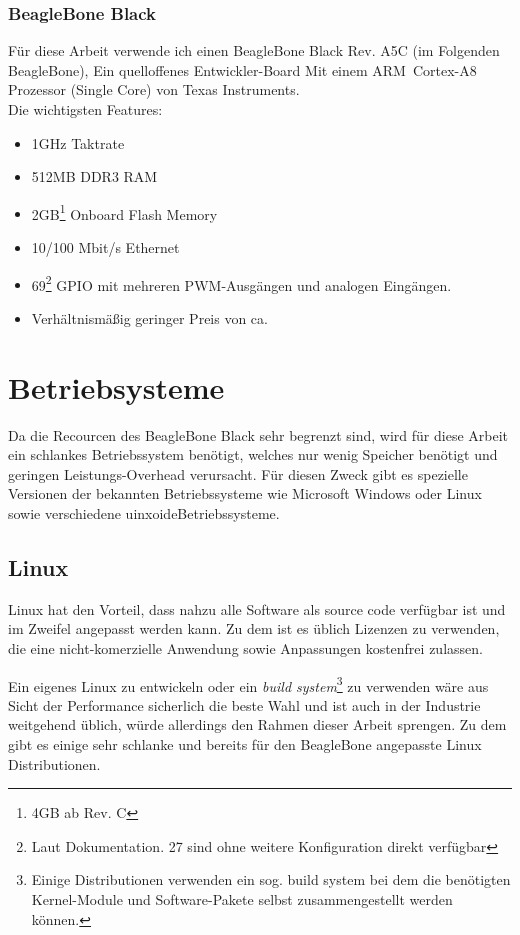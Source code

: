 \documentclass[12pt, twoside, a4paper]{scrbook}
\begin{document}
\subsection{BeagleBone Black}
Für diese Arbeit verwende ich einen BeagleBone Black Rev. A5C (im Folgenden BeagleBone), Ein quelloffenes Entwickler-Board Mit einem ARM\textregistered ~Cortex\texttrademark -A8 Prozessor (Single Core) von Texas Instruments.\\

Die wichtigsten Features:
\begin{itemize}
  \item 1GHz Taktrate
  \item 512MB DDR3 RAM
  \item 2GB\footnote{4GB ab Rev. C} Onboard Flash Memory
  \item 10/100 Mbit/s Ethernet
  \item 69\footnote{Laut Dokumentation. 27 sind ohne weitere Konfiguration direkt verfügbar} GPIO mit mehreren PWM-Ausgängen und analogen Eingängen.
  \item Verhältnismäßig geringer Preis von ca. 
\end{itemize}


\chapter{Betriebsysteme}
Da die Recourcen des BeagleBone Black sehr begrenzt sind, wird für diese Arbeit ein schlankes Betriebssystem benötigt, welches nur wenig Speicher benötigt und geringen Leistungs-Overhead verursacht. Für diesen Zweck gibt es spezielle Versionen der bekannten Betriebssysteme wie Microsoft Windows oder Linux sowie verschiedene \glqq uinxoide\grqq Betriebssysteme.

\section{Linux}
Linux hat den Vorteil, dass nahzu alle Software als source code verfügbar ist und im Zweifel angepasst werden kann. Zu dem ist es üblich Lizenzen zu verwenden, die eine nicht-komerzielle Anwendung sowie Anpassungen kostenfrei zulassen.

Ein eigenes Linux zu entwickeln oder ein \textit{build system}\footnote{Einige Distributionen verwenden ein sog. build system bei dem die benötigten Kernel-Module und Software-Pakete selbst zusammengestellt werden können.} zu verwenden wäre aus Sicht der Performance sicherlich die beste Wahl und ist auch in der Industrie weitgehend üblich, würde allerdings den Rahmen dieser Arbeit sprengen. Zu dem gibt es einige sehr schlanke und bereits für den BeagleBone angepasste Linux Distributionen.
\end{document}
